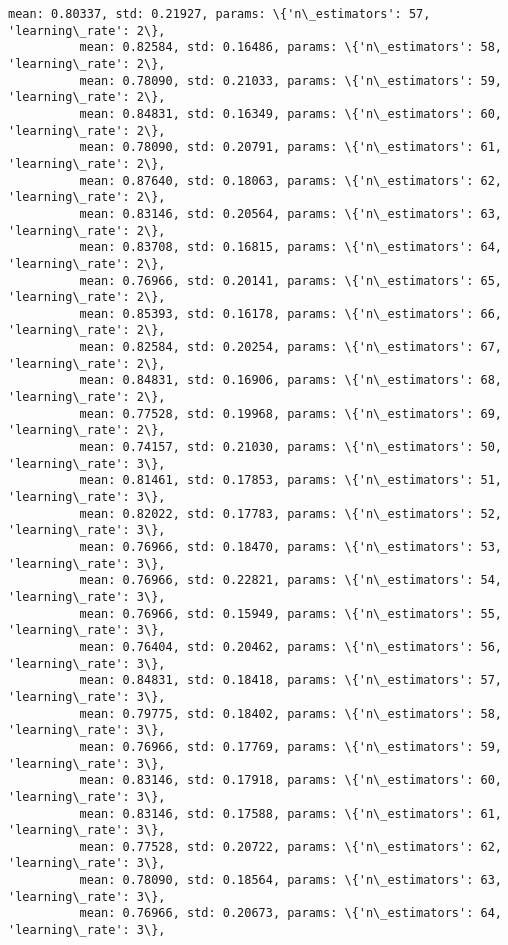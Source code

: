 \documentclass[11pt]{article}
\begin{document}
\begin{Verbatim}[commandchars=\\\{\}]
          mean: 0.80337, std: 0.21927, params: \{'n\_estimators': 57, 'learning\_rate': 2\},
          mean: 0.82584, std: 0.16486, params: \{'n\_estimators': 58, 'learning\_rate': 2\},
          mean: 0.78090, std: 0.21033, params: \{'n\_estimators': 59, 'learning\_rate': 2\},
          mean: 0.84831, std: 0.16349, params: \{'n\_estimators': 60, 'learning\_rate': 2\},
          mean: 0.78090, std: 0.20791, params: \{'n\_estimators': 61, 'learning\_rate': 2\},
          mean: 0.87640, std: 0.18063, params: \{'n\_estimators': 62, 'learning\_rate': 2\},
          mean: 0.83146, std: 0.20564, params: \{'n\_estimators': 63, 'learning\_rate': 2\},
          mean: 0.83708, std: 0.16815, params: \{'n\_estimators': 64, 'learning\_rate': 2\},
          mean: 0.76966, std: 0.20141, params: \{'n\_estimators': 65, 'learning\_rate': 2\},
          mean: 0.85393, std: 0.16178, params: \{'n\_estimators': 66, 'learning\_rate': 2\},
          mean: 0.82584, std: 0.20254, params: \{'n\_estimators': 67, 'learning\_rate': 2\},
          mean: 0.84831, std: 0.16906, params: \{'n\_estimators': 68, 'learning\_rate': 2\},
          mean: 0.77528, std: 0.19968, params: \{'n\_estimators': 69, 'learning\_rate': 2\},
          mean: 0.74157, std: 0.21030, params: \{'n\_estimators': 50, 'learning\_rate': 3\},
          mean: 0.81461, std: 0.17853, params: \{'n\_estimators': 51, 'learning\_rate': 3\},
          mean: 0.82022, std: 0.17783, params: \{'n\_estimators': 52, 'learning\_rate': 3\},
          mean: 0.76966, std: 0.18470, params: \{'n\_estimators': 53, 'learning\_rate': 3\},
          mean: 0.76966, std: 0.22821, params: \{'n\_estimators': 54, 'learning\_rate': 3\},
          mean: 0.76966, std: 0.15949, params: \{'n\_estimators': 55, 'learning\_rate': 3\},
          mean: 0.76404, std: 0.20462, params: \{'n\_estimators': 56, 'learning\_rate': 3\},
          mean: 0.84831, std: 0.18418, params: \{'n\_estimators': 57, 'learning\_rate': 3\},
          mean: 0.79775, std: 0.18402, params: \{'n\_estimators': 58, 'learning\_rate': 3\},
          mean: 0.76966, std: 0.17769, params: \{'n\_estimators': 59, 'learning\_rate': 3\},
          mean: 0.83146, std: 0.17918, params: \{'n\_estimators': 60, 'learning\_rate': 3\},
          mean: 0.83146, std: 0.17588, params: \{'n\_estimators': 61, 'learning\_rate': 3\},
          mean: 0.77528, std: 0.20722, params: \{'n\_estimators': 62, 'learning\_rate': 3\},
          mean: 0.78090, std: 0.18564, params: \{'n\_estimators': 63, 'learning\_rate': 3\},
          mean: 0.76966, std: 0.20673, params: \{'n\_estimators': 64, 'learning\_rate': 3\},

\end{Verbatim}
\end{document}
